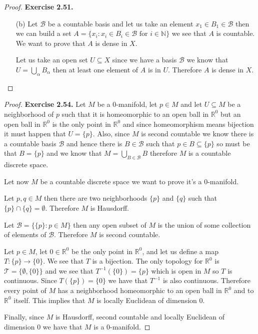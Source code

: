 \documentclass[11pt]{article}
\newcommand{\N}{\mathbb{N}}
\newcommand{\R}{\mathbb{R}}
\newcommand{\Topo}{\mathcal{T}}
\theoremstyle{definition}
\begin{document}
\begin{proof}{\textbf{Exercise 2.51.}}
\begin{itemize}
    \item [(b)] Let $\mathcal{B}$ be a countable basis and let us take
    an element $x_1 \in B_1 \in \mathcal{B}$ then we can build a set
    $A = \{x_i : x_i \in B_i \in \mathcal{B} \text{ for } i \in \N\}$
    we see that $A$ is countable. We want to prove that $A$ is dense in $X$.

    Let us take an open set $U \subseteq X$ since we have a basis $\mathcal{B}$
    we know that $U = \bigcup_\alpha B_\alpha$ then at least one element of $A$
    is in $U$. Therefore $A$ is dense in $X$.
\end{itemize}
\end{proof}
\cleardoublepage
\begin{proof}{\textbf{Exercise 2.54.}}
    Let $M$ be a $0$-manifold, let $p \in M$ and let $U \subseteq M$
    be a neighborhood of $p$ such that it is homeomorphic to
    an open ball in $\R^0$ but an open ball in $\R^0$ is the only point in
    $\R^0$ and since homeomorphism means bijection it must happen that
    $U = \{p\}$. Also, since $M$ is second countable we know there is a
    countable basis $\mathcal{B}$ and hence there is $B \in \mathcal{B}$
    such that $p \in B \subseteq \{p\}$ so must be that $B = \{p\}$
    and we know that $M = \bigcup_{B \in \mathcal{B}} B$ therefore $M$ is 
    a countable discrete space.

    Let now $M$ be a countable discrete space we want to prove it's a
    $0$-manifold.

    Let $p, q \in M$ then there are two neighborhoods $\{p\}$ and $\{q\}$
    such that $\{p\} \cap \{q\} = \emptyset$. Therefore $M$ is Hausdorff.

    Let $\mathcal{B} = \{\{p\}: p \in M\}$ then any open subset of $M$ is the
    union of some collection of elements of $\mathcal{B}$. Therefore $M$ is
    second countable.

    Let $p \in M$, let $0 \in \R^0$ be the only point in $\R^0$, and
    let us define a map $T: \{p\} \to \{0\}$.
    We see that $T$ is a bijection.
    The only topology for $\R^0$ is $\Topo = \{\emptyset, \{0\}\}$ and we see
    that $T^{-1}(\{0\}) = \{p\}$ which is open in $M$ so $T$ is continuous.
    Since $T(\{p\}) = \{0\}$ we have that $T^{-1}$ is also continuous.
    Therefore every point of $M$ has a neighborhood homeomorphic to an open
    ball in $\R^0$ and to $\R^0$ itself. This implies that $M$ is locally
    Euclidean of dimension $0$.

    Finally, since $M$ is Hausdorff, second countable and locally Euclidean of
    dimension $0$ we have that $M$ is a $0$-manifold.
\end{proof}
\end{document}
